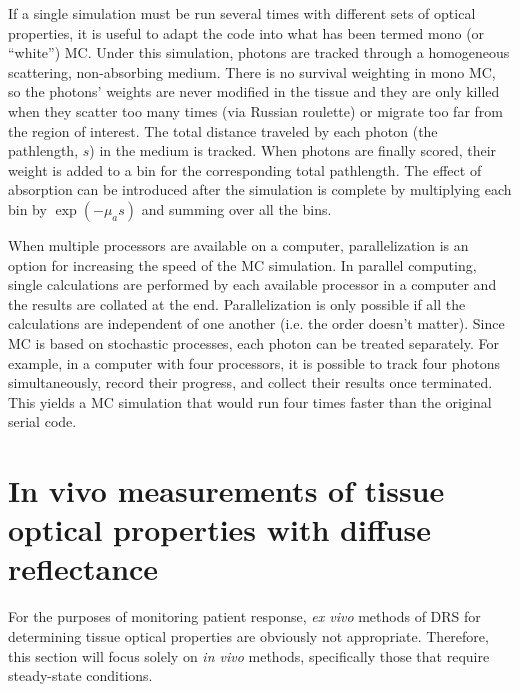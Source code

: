 If a single simulation must be run several times with different sets of optical properties, it is useful to adapt the code into what has been termed mono (or “white”) MC.\cite{Kienle1996a,Alerstam2013} Under this simulation, photons are tracked through a homogeneous scattering, non-absorbing medium. There is no survival weighting in mono MC, so the photons' weights are never modified in the tissue and they are only killed when they scatter too many times (via Russian roulette) or migrate too far from the region of interest. The total distance traveled by each photon (the pathlength, $s$) in the medium is tracked. When photons are finally scored, their weight is added to a bin for the corresponding total pathlength. The effect of absorption can be introduced after the simulation is complete by multiplying each bin by $\exp(-\mu_as)$ and summing over all the bins.

When multiple processors are available on a computer, parallelization is an option for increasing the speed of the MC simulation. In parallel computing, single calculations are performed by each available processor in a computer and the results are collated at the end. Parallelization is only possible if all the calculations are independent of one another (i.e. the order doesn't matter). Since MC is based on stochastic processes, each photon can be treated separately. For example, in a computer with four processors, it is possible to track four photons simultaneously, record their progress, and collect their results once terminated. This yields a MC simulation that would run four times faster than the original serial code.

\section{In vivo measurements of tissue optical properties with diffuse reflectance}
\label{sec:diff_refl}
For the purposes of monitoring patient response, \emph{ex vivo} methods of DRS for determining tissue optical properties are obviously not appropriate. Therefore, this section will focus solely on \emph{in vivo} methods, specifically those that require steady-state conditions.

